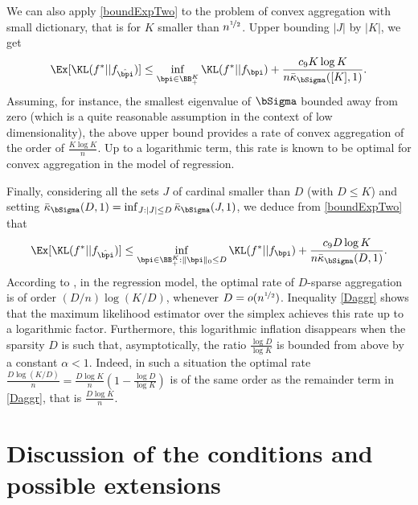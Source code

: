 We can also apply  \eqref{boundExpTwo} to the problem of convex aggregation with
small dictionary, that is for $K$ smaller than  $n^{\nicefrac12}$. Upper bounding $|J|$ by $|K|$,
we get
\begin{equation}
 \Ex[\KL(f^*|| f_{\hat\bpi})] \leq \inf_{\bpi \in \BB_+^K}
		\KL(f^*|| f_{\bpi}) +\frac{c_9 K \log K}{n\bar\kappa_{\bSigma}([K],1)}.
		\label{Caggr}
\end{equation}
Assuming, for instance, the smallest eigenvalue of $\bSigma$ bounded away from zero (which
is a quite reasonable assumption in the context of low dimensionality), the above upper
bound provides a rate of convex aggregation of the order of $\frac{K\log K}{n}$. Up to a
logarithmic term, this rate is known to be optimal for convex aggregation in the model of
regression.

Finally, considering all the sets $J$ of cardinal smaller than $D$ (with $D\le K$) and
setting $\bar\kappa_{\bSigma}(D,1) = \inf_{J:|J|\le D} \bar\kappa_{\bSigma}(J,1)$, we
deduce from \eqref{boundExpTwo} that
\begin{equation}
  \Ex[\KL(f^*|| f_{\hat\bpi})] \leq \inf_{\bpi\in \BB_+^K : \|\bpi\|_0\le D}
  \KL(f^*|| f_{\bpi}) + \frac{c_9 D\log K}{n\bar\kappa_{\bSigma}(D,1)}.\label{Daggr}
\end{equation}
According to \citep[Theorem 5.3]{RT11}, in the regression model, the optimal
rate of $D$-sparse aggregation is of order $(D/n)\log(K/D)$, whenever $D=o(n^{\nicefrac12})$.
Inequality \eqref{Daggr} shows that the maximum likelihood estimator over the simplex
achieves this rate up to a logarithmic factor. Furthermore, this logarithmic inflation
disappears when the sparsity $D$ is such that, asymptotically, the ratio $\frac{\log D}{\log K}$
is bounded from above by a constant $\alpha<1$. Indeed, in such a situation the optimal
rate $\frac{D\log(K/D)}{n} = \frac{D\log K}{n}(1-\frac{\log D}{\log K})$ is of the same
order as the remainder term in \eqref{Daggr}, that is $\frac{D\log K}{n}$.
			

\section{Discussion of the conditions and possible extensions} %
\label{sec:discussion_of_the_results}

